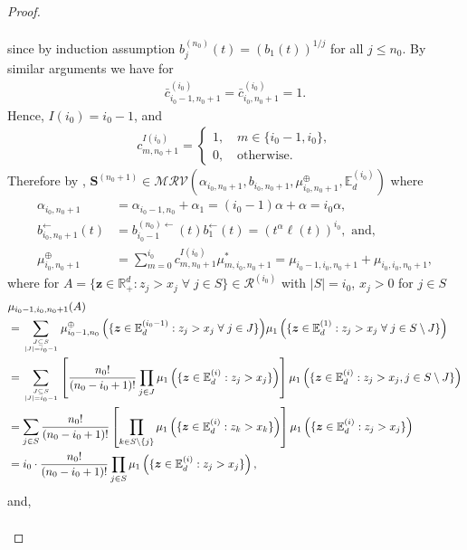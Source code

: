 \documentclass[aos]{imsart}
\numberwithin{equation}{section}
\theoremstyle{plain} %
\theoremstyle{remark}
\newcommand{\E}{\mathbb{E}}
\newcommand{\R}{\mathbb{R}}
\def\MRV{\mathcal{MRV}}
\def\bS{\boldsymbol{S}}
\def\bz{\boldsymbol z}
\begin{document}
\begin{proof}
\begin{enumerate}[(1)]
\begin{align*}
\end{align*}
since by induction assumption  $b_j^{(n_0)}(t) =(b_1(t))^{1/j}$ for all $j\le n_0$. By similar arguments we have for
\begin{align*}
\bar{c}_{i_0-1,n_0+1}^{(i_0)} =\bar{c}_{i_0,n_0+1}^{(i_0)}=1.
\end{align*}
Hence, $I(i_0)=i_0-1$, and
\begin{align*}
c_{m,n_0+1}^{I(i_0)} =\begin{cases}
    1, \quad m \in \{i_0-1, i_0\}, \\
    0, \quad \text{otherwise}.
\end{cases}
\end{align*}
Therefore by , $\bS^{(n_0+1)}\in\MRV(\alpha_{i_0,n_0+1},b_{i_0,n_0+1},\mu_{i_0,n_0+1}^{\oplus},\E_d^{(i_0)})$ where 
\begin{align*}
\alpha_{i_0,n_0+1} & =\alpha_{i_0-1,n_0}+\alpha_{1}=(i_0-1)\alpha+\alpha=i_0\alpha,\\
{b}_{i_0,n_0+1}^{\leftarrow}(t) & = b_{i_0-1}^{(n_0)\leftarrow}(t)b_1^{\leftarrow}(t)=(t^\alpha\ell(t))^{i_0}, \text{ and},\\
\mu_{i_0,n_0+1}^{\oplus} &= \sum_{m=0}^{i_0} c_{m,n_0+1}^{I(i_0)}\mu^*_{m,i_0,n_0+1} = \mu_{i_0-1,i_0,n_0+1} +  \mu_{i_0,i_0,n_0+1},
\end{align*}
where for $A=\{\bz\in\R_+^{d}:z_j>x_j\;\forall\; j\in S\}\in \mathcal{R}^{(i_0)}$ with $|S|= i_0$, $x_j>0$ for  $j\in S$
\begin{align*}
& \mu_{i_0-1,i_0,n_0+1}(A)\\
& = \sum_{\genfrac{}{}{0pt}{}{J\subseteq S}{|J|=i_0-1}} \mu_{i_0-1,n_0}^{\oplus} \,\Big(\{\bz\in\E_d^{(i_0-1)}: z_{j}>x_{j} \;\forall\;j\in J\}\Big)  \mu_{1}\left(\{\bz\in\E_d^{(1)}:z_{j}>x_{j}\;\forall\;j\in S\setminus J\}\right)\\
& = \sum_{\genfrac{}{}{0pt}{}{J\subseteq S}{|J|=i_0-1}} \left[\frac{n_0!}{(n_0-i_0+1)!}\prod_{j\in J}
    \mu_1\left(\{\bz\in \E_d^{(i)}:z_j>x_j\}\right)\right] \mu_1\left(\{\bz\in \E_d^{(i)}:z_j>x_j, j\in S\setminus J\}\right) \\
&= \sum_{j\in S}  \frac{n_0!}{(n_0-i_0+1)!}\left[ \prod_{k\in S\setminus \{j\}}
    \mu_1\left(\{\bz\in \E_d^{(i)}:z_k>x_k\}\right)\right]
    \mu_1\left(\{\bz\in \E_d^{(i)}:z_j>x_j\}\right)\\
    &= i_0 \cdot \frac{n_0!}{(n_0-i_0+1)!} \prod_{j\in S}
    \mu_1\left(\{\bz\in \E_d^{(i)}:z_j>x_j\}\right),
\end{align*}
and,
\begin{align*}

\end{align*}
\end{enumerate}
\end{proof}
\end{document}
